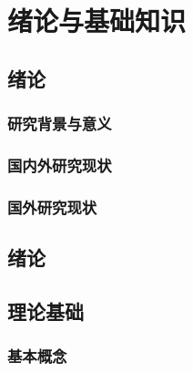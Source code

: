 \documentclass{USTBBook}
\begin{document}
\frontmatter

\setcounter{page}{0}
\cleardoublepage
{}

\tableofcontents

\mainmatter

\part{绪论与基础知识}

\chapter{绪论}
\zhlipsum[1]

\section{研究背景与意义}
\zhlipsum[2]

\zhlipsum[6-7]

\section{国内外研究现状}
\zhlipsum[3-5]

\section{国外研究现状}
\subsection{}
\zhlipsum[4]

\subsection{}
\zhlipsum[5]

\chapter{绪论}
\zhlipsum[1]

\chapter{理论基础}
\zhlipsum[6]

\section{基本概念}
\zhlipsum[7]
\end{document}
